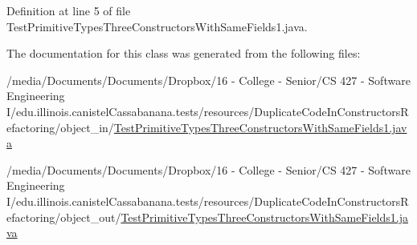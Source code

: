 Definition at line 5 of file TestPrimitiveTypesThreeConstructorsWithSameFields1.java.



The documentation for this class was generated from the following files:\begin{DoxyCompactItemize}
\item 
/media/Documents/Documents/Dropbox/16 -\/ College -\/ Senior/CS 427 -\/ Software Engineering I/edu.illinois.canistelCassabanana.tests/resources/DuplicateCodeInConstructorsRefactoring/object\_\-in/\hyperlink{object__in_2TestPrimitiveTypesThreeConstructorsWithSameFields1_8java}{TestPrimitiveTypesThreeConstructorsWithSameFields1.java}\item 
/media/Documents/Documents/Dropbox/16 -\/ College -\/ Senior/CS 427 -\/ Software Engineering I/edu.illinois.canistelCassabanana.tests/resources/DuplicateCodeInConstructorsRefactoring/object\_\-out/\hyperlink{object__out_2TestPrimitiveTypesThreeConstructorsWithSameFields1_8java}{TestPrimitiveTypesThreeConstructorsWithSameFields1.java}\end{DoxyCompactItemize}
